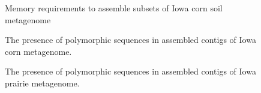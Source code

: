 \documentclass[11pt]{article} %
\begin{document}
\begin{figure}[ht]
\caption{Memory requirements to assemble subsets of Iowa corn soil metagenome}
\label{memory}
\end{figure}

\begin{figure}[ht]
\caption{The presence of polymorphic sequences in assembled contigs of Iowa corn metagenome.}
\label{corn-poly}
\end{figure}

\begin{figure}[ht]
\caption{The presence of polymorphic sequences in assembled contigs of Iowa prairie metagenome.}
\label{prairie-poly}
\end{figure}
\end{document}
